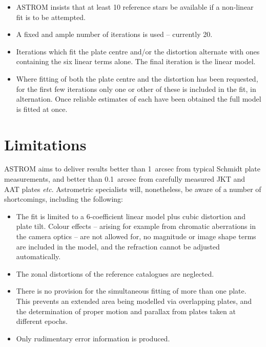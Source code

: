 \documentclass[twoside,11pt]{article}
\newcommand{\xlabel}[1]{}
\renewcommand{\_}{\texttt{\symbol{95}}}
\begin{document}
\begin{itemize}

\item ASTROM insists that at least 10 reference stars be available
   if a non-linear fit is to be attempted.

\item A fixed and ample number of iterations is used -- currently 20.

\item Iterations which fit the plate centre and/or the distortion
   alternate with ones containing the six linear terms alone.  The final
   iteration is the linear model.

\item Where fitting of both the plate centre and the distortion has been
   requested, for the first few iterations only one or other of these
   is included in the fit, in alternation.  Once reliable estimates of
   each have been obtained the full model is fitted at once.

\end{itemize}

\section{\xlabel{limitation}Limitations}
\label{limitations}

ASTROM aims to deliver results better than 1~arcsec from typical Schmidt
plate measurements, and better than 0.1~arcsec from carefully measured
JKT and AAT plates \emph{etc}.  Astrometric specialists will, nonetheless,
be aware of a number of shortcomings, including the following:

\begin{itemize}

   \item The fit is limited to a 6-coefficient linear model plus cubic
      distortion and plate tilt.  Colour effects -- arising for example
      from chromatic aberrations in the camera optics -- are not allowed
      for, no magnitude or image shape terms are included in the model,
      and the refraction cannot be adjusted automatically.

   \item The zonal distortions of the reference catalogues are neglected.

   \item There is no provision for the simultaneous fitting of more
      than one plate.  This prevents an extended area being modelled
      via overlapping plates, and the determination of proper motion
      and parallax from plates taken at different epochs.

   \item Only rudimentary error information is produced.

\end{itemize}
\end{document}
